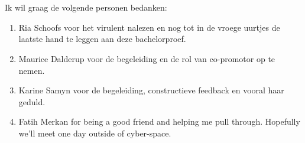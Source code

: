 
\chapter*{}
\label{ch:voorwoord}


Ik wil graag de volgende personen bedanken:

\begin{enumerate}
\item Ria Schoofs voor het virulent nalezen en nog tot in de vroege uurtjes de laatste hand te leggen aan deze bachelorproef.
\item Maurice Dalderup voor de begeleiding en de rol van co-promotor op te nemen.
\item Karine Samyn voor de begeleiding, constructieve feedback en vooral haar geduld.
\item Fatih Merkan for being a good friend and helping me pull through. Hopefully we'll meet one day outside of cyber-space. 
\end{enumerate}
